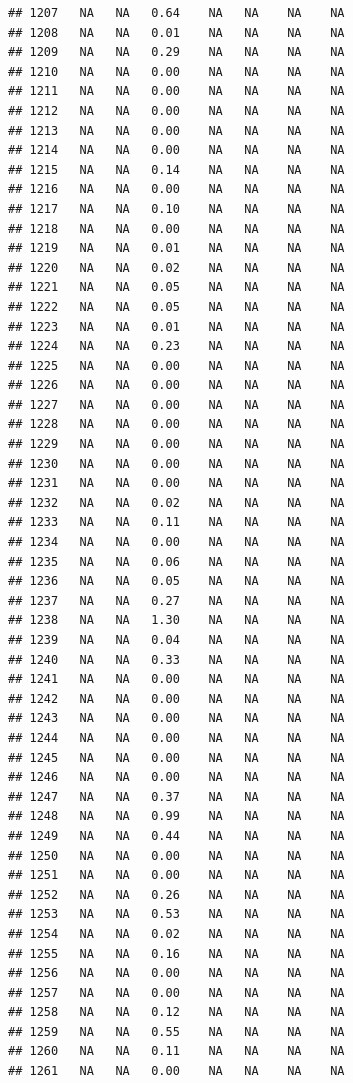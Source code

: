 \documentclass{article}\usepackage{graphicx, color}
\makeatletter
\newenvironment{kframe}{%
 \def\at@end@of@kframe{}%
 \ifinner\ifhmode%
  \def\at@end@of@kframe{\end{minipage}}%
  \begin{minipage}{\columnwidth}%
 \fi\fi%
 \def\FrameCommand##1{\hskip\@totalleftmargin \hskip-\fboxsep
 \colorbox{shadecolor}{##1}\hskip-\fboxsep
     \hskip-\linewidth \hskip-\@totalleftmargin \hskip\columnwidth}%
 \MakeFramed {\advance\hsize-\width
   \@totalleftmargin\z@ \linewidth\hsize
   \@setminipage}}%
 {\par\unskip\endMakeFramed%
 \at@end@of@kframe}
\newenvironment{knitrout}{}{} %
\makeatother
\begin{document}
\begin{knitrout}
\begin{kframe}
\begin{verbatim}
## 1207   NA   NA   0.64    NA   NA    NA    NA
## 1208   NA   NA   0.01    NA   NA    NA    NA
## 1209   NA   NA   0.29    NA   NA    NA    NA
## 1210   NA   NA   0.00    NA   NA    NA    NA
## 1211   NA   NA   0.00    NA   NA    NA    NA
## 1212   NA   NA   0.00    NA   NA    NA    NA
## 1213   NA   NA   0.00    NA   NA    NA    NA
## 1214   NA   NA   0.00    NA   NA    NA    NA
## 1215   NA   NA   0.14    NA   NA    NA    NA
## 1216   NA   NA   0.00    NA   NA    NA    NA
## 1217   NA   NA   0.10    NA   NA    NA    NA
## 1218   NA   NA   0.00    NA   NA    NA    NA
## 1219   NA   NA   0.01    NA   NA    NA    NA
## 1220   NA   NA   0.02    NA   NA    NA    NA
## 1221   NA   NA   0.05    NA   NA    NA    NA
## 1222   NA   NA   0.05    NA   NA    NA    NA
## 1223   NA   NA   0.01    NA   NA    NA    NA
## 1224   NA   NA   0.23    NA   NA    NA    NA
## 1225   NA   NA   0.00    NA   NA    NA    NA
## 1226   NA   NA   0.00    NA   NA    NA    NA
## 1227   NA   NA   0.00    NA   NA    NA    NA
## 1228   NA   NA   0.00    NA   NA    NA    NA
## 1229   NA   NA   0.00    NA   NA    NA    NA
## 1230   NA   NA   0.00    NA   NA    NA    NA
## 1231   NA   NA   0.00    NA   NA    NA    NA
## 1232   NA   NA   0.02    NA   NA    NA    NA
## 1233   NA   NA   0.11    NA   NA    NA    NA
## 1234   NA   NA   0.00    NA   NA    NA    NA
## 1235   NA   NA   0.06    NA   NA    NA    NA
## 1236   NA   NA   0.05    NA   NA    NA    NA
## 1237   NA   NA   0.27    NA   NA    NA    NA
## 1238   NA   NA   1.30    NA   NA    NA    NA
## 1239   NA   NA   0.04    NA   NA    NA    NA
## 1240   NA   NA   0.33    NA   NA    NA    NA
## 1241   NA   NA   0.00    NA   NA    NA    NA
## 1242   NA   NA   0.00    NA   NA    NA    NA
## 1243   NA   NA   0.00    NA   NA    NA    NA
## 1244   NA   NA   0.00    NA   NA    NA    NA
## 1245   NA   NA   0.00    NA   NA    NA    NA
## 1246   NA   NA   0.00    NA   NA    NA    NA
## 1247   NA   NA   0.37    NA   NA    NA    NA
## 1248   NA   NA   0.99    NA   NA    NA    NA
## 1249   NA   NA   0.44    NA   NA    NA    NA
## 1250   NA   NA   0.00    NA   NA    NA    NA
## 1251   NA   NA   0.00    NA   NA    NA    NA
## 1252   NA   NA   0.26    NA   NA    NA    NA
## 1253   NA   NA   0.53    NA   NA    NA    NA
## 1254   NA   NA   0.02    NA   NA    NA    NA
## 1255   NA   NA   0.16    NA   NA    NA    NA
## 1256   NA   NA   0.00    NA   NA    NA    NA
## 1257   NA   NA   0.00    NA   NA    NA    NA
## 1258   NA   NA   0.12    NA   NA    NA    NA
## 1259   NA   NA   0.55    NA   NA    NA    NA
## 1260   NA   NA   0.11    NA   NA    NA    NA
## 1261   NA   NA   0.00    NA   NA    NA    NA

\end{verbatim}
\end{kframe}
\end{knitrout}
\end{document}
